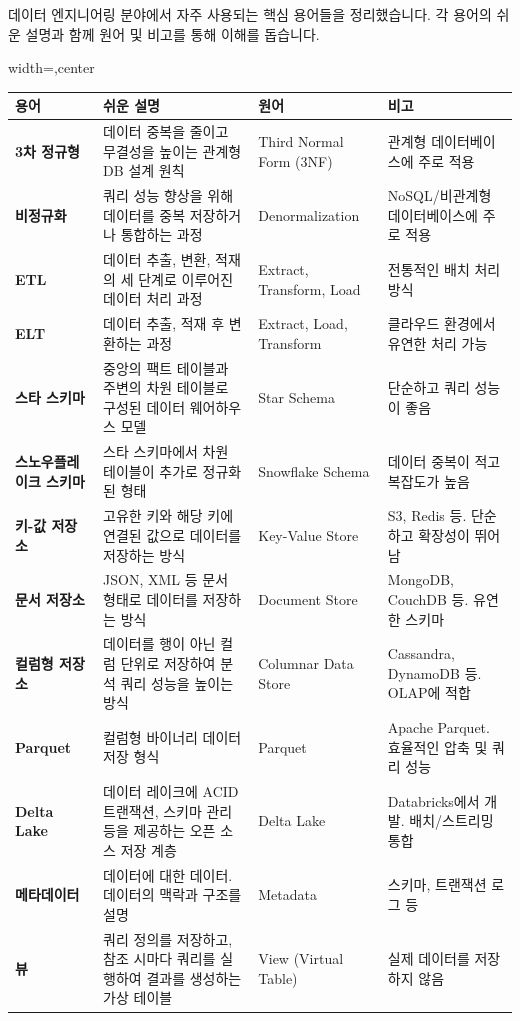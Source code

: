 \documentclass[11pt,a4paper]{article}
\begin{document}
데이터 엔지니어링 분야에서 자주 사용되는 핵심 용어들을 정리했습니다.
각 용어의 쉬운 설명과 함께 원어 및 비고를 통해 이해를 돕습니다.

\begin{adjustbox}{width=\textwidth,center}
\begin{tabular}{llll}
\toprule
\textbf{용어} & \textbf{쉬운 설명} & \textbf{원어} & \textbf{비고} \\
\midrule
\textbf{3차 정규형} & 데이터 중복을 줄이고 무결성을 높이는 관계형 DB 설계 원칙 & Third Normal Form (3NF) & 관계형 데이터베이스에 주로 적용 \\
\textbf{비정규화} & 쿼리 성능 향상을 위해 데이터를 중복 저장하거나 통합하는 과정 & Denormalization & NoSQL/비관계형 데이터베이스에 주로 적용 \\
\textbf{ETL} & 데이터 추출, 변환, 적재의 세 단계로 이루어진 데이터 처리 과정 & Extract, Transform, Load & 전통적인 배치 처리 방식 \\
\textbf{ELT} & 데이터 추출, 적재 후 변환하는 과정 & Extract, Load, Transform & 클라우드 환경에서 유연한 처리 가능 \\
\textbf{스타 스키마} & 중앙의 팩트 테이블과 주변의 차원 테이블로 구성된 데이터 웨어하우스 모델 & Star Schema & 단순하고 쿼리 성능이 좋음 \\
\textbf{스노우플레이크 스키마} & 스타 스키마에서 차원 테이블이 추가로 정규화된 형태 & Snowflake Schema & 데이터 중복이 적고 복잡도가 높음 \\
\textbf{키-값 저장소} & 고유한 키와 해당 키에 연결된 값으로 데이터를 저장하는 방식 & Key-Value Store & S3, Redis 등. 단순하고 확장성이 뛰어남 \\
\textbf{문서 저장소} & JSON, XML 등 문서 형태로 데이터를 저장하는 방식 & Document Store & MongoDB, CouchDB 등. 유연한 스키마 \\
\textbf{컬럼형 저장소} & 데이터를 행이 아닌 컬럼 단위로 저장하여 분석 쿼리 성능을 높이는 방식 & Columnar Data Store & Cassandra, DynamoDB 등. OLAP에 적합 \\
\textbf{Parquet} & 컬럼형 바이너리 데이터 저장 형식 & Parquet & Apache Parquet. 효율적인 압축 및 쿼리 성능 \\
\textbf{Delta Lake} & 데이터 레이크에 ACID 트랜잭션, 스키마 관리 등을 제공하는 오픈 소스 저장 계층 & Delta Lake & Databricks에서 개발. 배치/스트리밍 통합 \\
\textbf{메타데이터} & 데이터에 대한 데이터. 데이터의 맥락과 구조를 설명 & Metadata & 스키마, 트랜잭션 로그 등 \\
\textbf{뷰} & 쿼리 정의를 저장하고, 참조 시마다 쿼리를 실행하여 결과를 생성하는 가상 테이블 & View (Virtual Table) & 실제 데이터를 저장하지 않음 \\

\end{tabular}
\end{adjustbox}
\end{document}
